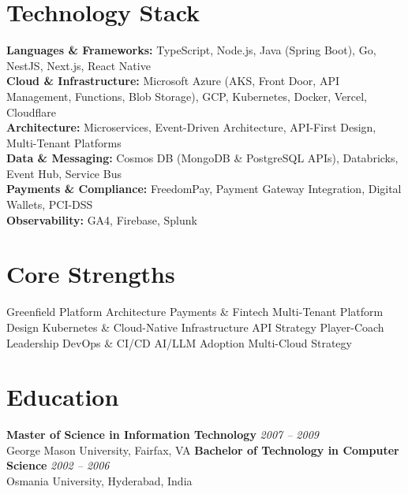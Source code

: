 \documentclass[11pt]{article}
\begin{document}
\section*{Technology Stack}
\textbf{Languages \& Frameworks:} TypeScript, Node.js, Java (Spring Boot), Go, NestJS, Next.js, React Native \\
\textbf{Cloud \& Infrastructure:} Microsoft Azure (AKS, Front Door, API Management, Functions, Blob Storage), GCP, Kubernetes, Docker, Vercel, Cloudflare \\
\textbf{Architecture:} Microservices, Event-Driven Architecture, API-First Design, Multi-Tenant Platforms \\
\textbf{Data \& Messaging:} Cosmos DB (MongoDB \& PostgreSQL APIs), Databricks, Event Hub, Service Bus \\
\textbf{Payments \& Compliance:} FreedomPay, Payment Gateway Integration, Digital Wallets, PCI-DSS \\
\textbf{Observability:} GA4, Firebase, Splunk

\section*{Core Strengths}
Greenfield Platform Architecture \textbullet{} Payments \& Fintech \textbullet{} Multi-Tenant Platform Design \textbullet{} Kubernetes \& Cloud-Native Infrastructure \textbullet{} API Strategy \textbullet{} Player-Coach Leadership \textbullet{} DevOps \& CI/CD \textbullet{} AI/LLM Adoption \textbullet{} Multi-Cloud Strategy

\pagebreak

\section*{Education}
\textbf{Master of Science in Information Technology} \hfill \textit{2007 -- 2009} \\
George Mason University, Fairfax, VA
\newline
\textbf{Bachelor of Technology in Computer Science} \hfill \textit{2002 -- 2006} \\
Osmania University, Hyderabad, India
\end{document}
